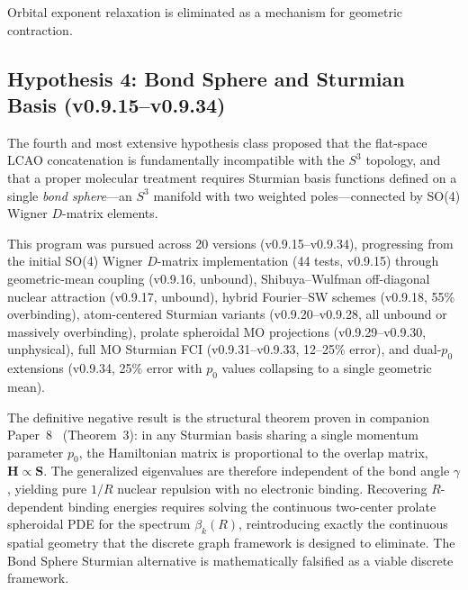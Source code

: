 \documentclass[aps,pra,twocolumn,superscriptaddress,longbibliography]{revtex4-2}
\begin{document}
Orbital exponent relaxation is eliminated as a mechanism for geometric
contraction.

\subsection{Hypothesis 4: Bond Sphere and Sturmian Basis
(v0.9.15--v0.9.34)}
\label{sec:hyp_sturmian}

The fourth and most extensive hypothesis class proposed that the
flat-space LCAO concatenation is fundamentally incompatible with the
$S^3$ topology, and that a proper molecular treatment requires Sturmian
basis functions defined on a single \emph{bond sphere}---an $S^3$
manifold with two weighted poles---connected by SO(4) Wigner $D$-matrix
elements.

This program was pursued across 20 versions (v0.9.15--v0.9.34),
progressing from the initial SO(4) Wigner $D$-matrix implementation (44
tests, v0.9.15) through geometric-mean coupling (v0.9.16, unbound),
Shibuya--Wulfman off-diagonal nuclear attraction (v0.9.17, unbound),
hybrid Fourier--SW schemes (v0.9.18, 55\% overbinding), atom-centered
Sturmian variants (v0.9.20--v0.9.28, all unbound or massively
overbinding), prolate spheroidal MO projections
(v0.9.29--v0.9.30, unphysical), full MO Sturmian FCI
(v0.9.31--v0.9.33, 12--25\% error), and dual-$p_0$ extensions (v0.9.34,
25\% error with $p_0$ values collapsing to a single geometric mean).

The definitive negative result is the structural theorem proven in
companion Paper~8~\cite{paper8} (Theorem~3): in any Sturmian basis
sharing a single momentum parameter $p_0$, the Hamiltonian matrix is
proportional to the overlap matrix,
$\mathbf{H} \propto \mathbf{S}$.  The generalized eigenvalues are
therefore independent of the bond angle $\gamma$, yielding pure $1/R$
nuclear repulsion with no electronic binding.  Recovering
$R$-dependent binding energies requires solving the continuous
two-center prolate spheroidal PDE for the spectrum $\beta_k(R)$,
reintroducing exactly the continuous spatial geometry that the discrete
graph framework is designed to eliminate.  The Bond Sphere Sturmian
alternative is mathematically falsified as a viable discrete framework.
\end{document}
